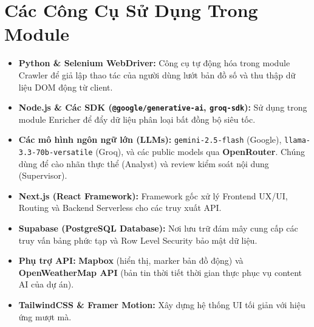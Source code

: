 \documentclass[12pt]{article}
\begin{document}
\section{Các Công Cụ Sử Dụng Trong Module}
\begin{itemize}
    \item \textbf{Python \& Selenium WebDriver:} Công cụ tự động hóa trong module Crawler để giả lập thao tác của người dùng lướt bản đồ số và thu thập dữ liệu DOM động từ client.
    \item \textbf{Node.js \& Các SDK (\texttt{@google/generative-ai}, \texttt{groq-sdk}):} Sử dụng trong module Enricher để đẩy dữ liệu phân loại bất đồng bộ siêu tốc.
    \item \textbf{Các mô hình ngôn ngữ lớn (LLMs):} \texttt{gemini-2.5-flash} (Google), \texttt{llama-3.3-70b-versatile} (Groq), và các public models qua \textbf{OpenRouter}. Chúng dùng để cào nhãn thực thể (Analyst) và review kiểm soát nội dung (Supervisor).
    \item \textbf{Next.js (React Framework):} Framework gốc xử lý Frontend UX/UI, Routing và Backend Serverless cho các truy xuất API.
    \item \textbf{Supabase (PostgreSQL Database):} Nơi lưu trữ đám mây cung cấp các truy vấn bảng phức tạp và Row Level Security bảo mật dữ liệu.
    \item \textbf{Phụ trợ API:} \textbf{Mapbox} (hiển thị, marker bản đồ động) và \textbf{OpenWeatherMap API} (bản tin thời tiết thời gian thực phục vụ content AI của dự án).
    \item \textbf{TailwindCSS \& Framer Motion:} Xây dựng hệ thống UI tối giản với hiệu ứng mượt mà.
\end{itemize}
\end{document}
